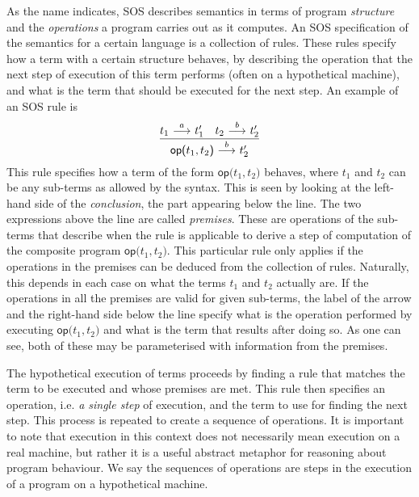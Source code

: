 As the name indicates, SOS describes semantics in terms of program \emph{structure}
and the \emph{operations} a program carries out as it computes. 
An SOS specification of the semantics for a certain
language is a collection of rules. These rules specify how a term with a certain
structure behaves, by describing the operation that the next step of execution
of this term performs
(often on a hypothetical machine), and what is the term that should be executed
for the next step. An example of an SOS rule is
\begin{equation}\label{eq:intro_rule1}
    \frac{t_1 \ {\stackrel{{a}}{\longrightarrow}}\  t_1' \quad t_2 \ {\stackrel{{b}}{\longrightarrow}}\  t_2'}{\textsf{op(}t_1,t_2\textsf{)}\ {\stackrel{{b}}{\longrightarrow}}\  t_2'}
\end{equation}
This rule specifies how a term of the form $\textsf{op(}t_1,t_2\textsf{)}$ behaves, where $t_1$
and $t_2$ can be any sub-terms as allowed by the syntax. This is seen by looking
at the left-hand side of the \emph{conclusion}, the part appearing below the line. 
The two expressions above
the line are called \emph{premises}. These are operations of the sub-terms
that describe when the rule is applicable to derive a step of computation
of the composite program $\textsf{op(}t_1,t_2\textsf{)}$.
This particular rule only applies if the operations in the premises can be
deduced from the collection of rules. Naturally, this depends in each case on what
the terms $t_1$ and $t_2$ actually are. If the operations in all the premises
are valid for given sub-terms, the label of the arrow and the right-hand side below the line
specify what is the operation performed by executing $\textsf{op(}t_1,t_2\textsf{)}$
and what is the term that results after doing so. As one can see, both of these may
be parameterised with information from the premises.

The hypothetical execution of terms proceeds by finding a rule that matches the
term to be executed and whose premises are met. This rule then specifies an operation,
i.e. \emph{a single step} of execution, and the term to use for finding the
next step. This process is repeated to create a sequence of operations.
It is important to note that execution in this context does not necessarily mean
execution on a real machine, but rather it is a useful abstract metaphor for reasoning about
program behaviour. We say the sequences of operations are steps in the execution
of a program on a hypothetical machine.

